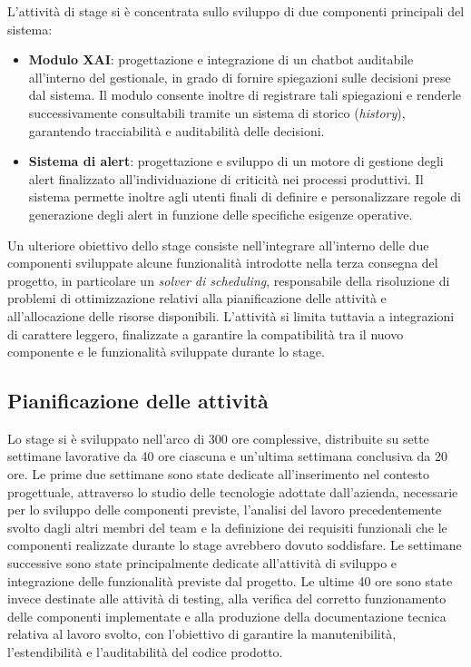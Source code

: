 L'attività di stage si è concentrata sullo sviluppo di due componenti principali del sistema:

\begin{itemize}
    \item \textbf{Modulo XAI}: progettazione e integrazione di un chatbot auditabile all'interno del gestionale, in grado di fornire spiegazioni sulle decisioni prese dal sistema. 
    Il modulo consente inoltre di registrare tali spiegazioni e renderle successivamente consultabili tramite un sistema di storico (\textit{history}), garantendo tracciabilità 
    e auditabilità delle decisioni.
    \item \textbf{Sistema di alert}: progettazione e sviluppo di un motore di gestione degli alert finalizzato all'individuazione di criticità nei processi produttivi. 
    Il sistema permette inoltre agli utenti finali di definire e personalizzare regole di generazione degli alert in funzione delle specifiche esigenze operative.
\end{itemize}
Un ulteriore obiettivo dello stage consiste nell'integrare all'interno delle due componenti sviluppate alcune funzionalità introdotte nella terza consegna del progetto, in 
particolare un \textit{solver di scheduling}, responsabile della risoluzione di problemi di ottimizzazione relativi alla pianificazione delle attività e all'allocazione delle 
risorse disponibili. L'attività si limita tuttavia a integrazioni di carattere leggero, finalizzate a garantire la compatibilità tra il nuovo componente e le funzionalità 
sviluppate durante lo stage.

\subsection{Pianificazione delle attività}
Lo stage si è sviluppato nell'arco di 300 ore complessive, distribuite su sette settimane lavorative da 40 ore ciascuna e un'ultima settimana conclusiva da 20 ore.
\newline
Le prime due settimane sono state dedicate all'inserimento nel contesto progettuale, attraverso lo studio delle tecnologie adottate dall'azienda, necessarie per lo sviluppo 
delle componenti previste, l'analisi del lavoro precedentemente svolto dagli altri membri del team e la definizione dei requisiti funzionali che le componenti realizzate 
durante lo stage avrebbero dovuto soddisfare.
\newline
Le settimane successive sono state principalmente dedicate all'attività di sviluppo e integrazione delle funzionalità previste dal progetto. Le ultime 40 ore sono state 
invece destinate alle attività di testing, alla verifica del corretto funzionamento delle componenti implementate e alla produzione della documentazione tecnica relativa al 
lavoro svolto, con l'obiettivo di garantire la manutenibilità, l'estendibilità e l'auditabilità del codice prodotto.

